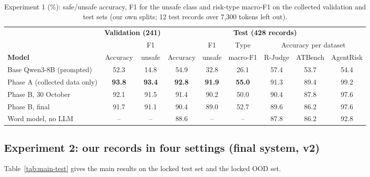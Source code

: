 \documentclass[10pt]{article}
\begin{document}
\begin{table}[h]
\centering\footnotesize
\setlength{\tabcolsep}{4pt}
\begin{tabular}{@{}lcc@{\hspace{10pt}}cccccc@{}}
\toprule
 & \multicolumn{2}{c}{\textbf{Validation (241)}} & \multicolumn{6}{c}{\textbf{Test (428 records)}}\\
\cmidrule(lr){2-3}\cmidrule(lr){4-9}
 & & F1 & & F1 & Type & \multicolumn{3}{c}{Accuracy per dataset}\\
\textbf{Model} & Accuracy & unsafe & Accuracy & unsafe & macro-F1 & R-Judge & ATBench & AgentRisk\\
\midrule
Base Qwen3-8B (prompted) & 52.3 & 14.8 & 54.9 & 32.8 & 26.1 & 57.4 & 53.7 & 54.4\\
Phase A (collected data only) & \textbf{93.8} & \textbf{93.4} & \textbf{92.8} & \textbf{91.9} & \textbf{55.0} & 91.3 & 89.4 & 99.2\\
Phase B, 30 October & 92.1 & 91.5 & 91.4 & 90.2 & 50.0 & 90.4 & 87.8 & 97.6\\
Phase B, final & 91.7 & 91.1 & 90.4 & 89.0 & 52.7 & 89.6 & 86.2 & 97.6\\
Word model, no LLM & -- & -- & 88.6 & -- & -- & 87.8 & 86.2 & 92.8\\
\bottomrule
\end{tabular}
\caption{Experiment 1 (\%): safe/unsafe accuracy, F1 for the unsafe class and risk-type macro-F1 on the
collected validation and test sets (our own splits; 12 test records over 7,300 tokens left out).}
\label{tab:exp1}
\end{table}

\subsection{Experiment 2: our records in four settings (final system, v2)}
Table~\ref{tab:main-test} gives the main results on the locked test set and the locked OOD set.
\end{document}
